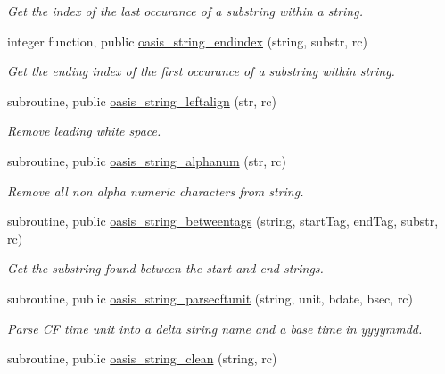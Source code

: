 \begin{DoxyCompactItemize}
\begin{DoxyCompactList}\small\item\em Get the index of the last occurance of a substring within a string. \end{DoxyCompactList}\item 
integer function, public \hyperlink{namespacemod__oasis__string_a600ed4bd6221a0195d242076217377b4}{oasis\+\_\+string\+\_\+endindex} (string, substr, rc)
\begin{DoxyCompactList}\small\item\em Get the ending index of the first occurance of a substring within string. \end{DoxyCompactList}\item 
subroutine, public \hyperlink{namespacemod__oasis__string_a1d525e36684a0a574b74a2aace51324a}{oasis\+\_\+string\+\_\+leftalign} (str, rc)
\begin{DoxyCompactList}\small\item\em Remove leading white space. \end{DoxyCompactList}\item 
subroutine, public \hyperlink{namespacemod__oasis__string_af123aee419f09309d1ded79ae41243bd}{oasis\+\_\+string\+\_\+alphanum} (str, rc)
\begin{DoxyCompactList}\small\item\em Remove all non alpha numeric characters from string. \end{DoxyCompactList}\item 
subroutine, public \hyperlink{namespacemod__oasis__string_a465ffaf8d7c5462f3de8595934d58c8d}{oasis\+\_\+string\+\_\+betweentags} (string, start\+Tag, end\+Tag, substr, rc)
\begin{DoxyCompactList}\small\item\em Get the substring found between the start and end strings. \end{DoxyCompactList}\item 
subroutine, public \hyperlink{namespacemod__oasis__string_a2f7bae9ccc5d2c48c14f3a1525a6c234}{oasis\+\_\+string\+\_\+parsecftunit} (string, unit, bdate, bsec, rc)
\begin{DoxyCompactList}\small\item\em Parse CF time unit into a delta string name and a base time in yyyymmdd. \end{DoxyCompactList}\item 
subroutine, public \hyperlink{namespacemod__oasis__string_aaf462e055c2c6136ef5d142d03355673}{oasis\+\_\+string\+\_\+clean} (string, rc)

\end{DoxyCompactItemize}
